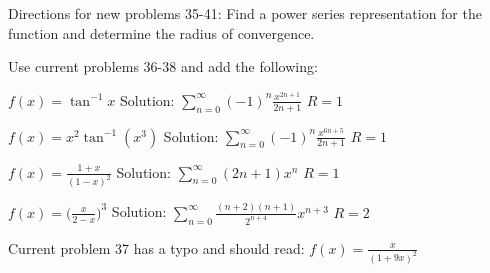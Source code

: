 \documentclass[10pt]{article}
\newcommand{\ds}{\displaystyle}
\begin{document}
 Directions for new problems 35-41:  Find a power series representation for the function and determine the radius of convergence.  

Use current problems 36-38 and add the following:

$ f(x)=\tan^{-1}x$ 				Solution: $\ds \sum_{n=0}^{\infty}(-1)^n \frac{x^{2n+1}}{2n+1}$  $R=1$

$f(x)=x^2\tan^{-1}(x^3)$			Solution: $\ds \sum_{n=0}^{\infty}(-1)^n \frac{x^{6n+5}}{2n+1}$  $R=1$

$\ds f(x)=\frac{1+x}{(1-x)^2}$			Solution: $\ds \sum_{n=0}^{\infty} (2n+1)x^n$  $R=1$

$\ds f(x)=\biggl(\frac{x}{2-x}\biggr)^3$	Solution: $\ds \sum_{n=0}^{\infty} \frac{(n+2)(n+1)}{2^{n+4}}x^{n+3}$  $R=2$


Current problem 37 has a typo and should read:  $\ds f(x)=\frac{x}{(1+9x)^2}$   
\end{document}
